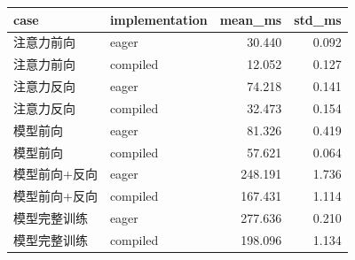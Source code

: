 \begin{tabular}{llrr}
\toprule
case & implementation & mean\_ms & std\_ms \\
\midrule
注意力前向 & eager & 30.440 & 0.092 \\
注意力前向 & compiled & 12.052 & 0.127 \\
注意力反向 & eager & 74.218 & 0.141 \\
注意力反向 & compiled & 32.473 & 0.154 \\
模型前向 & eager & 81.326 & 0.419 \\
模型前向 & compiled & 57.621 & 0.064 \\
模型前向+反向 & eager & 248.191 & 1.736 \\
模型前向+反向 & compiled & 167.431 & 1.114 \\
模型完整训练 & eager & 277.636 & 0.210 \\
模型完整训练 & compiled & 198.096 & 1.134 \\
\bottomrule
\end{tabular}
